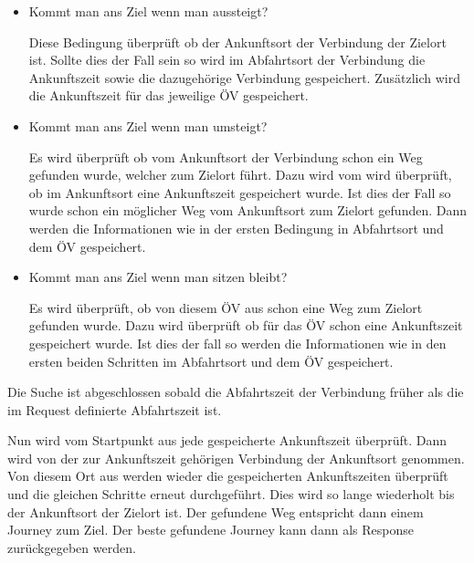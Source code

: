 \begin{itemize}
	\item Kommt man ans Ziel wenn man aussteigt?
	
	Diese Bedingung überprüft ob der Ankunftsort der Verbindung der Zielort ist. Sollte dies der Fall sein so wird im Abfahrtsort der Verbindung die Ankunftszeit sowie die dazugehörige Verbindung gespeichert. Zusätzlich wird die Ankunftszeit für das jeweilige ÖV gespeichert.
	\item Kommt man ans Ziel wenn man umsteigt?
	
	Es wird überprüft ob vom Ankunftsort der Verbindung schon ein Weg gefunden wurde, welcher zum Zielort führt. Dazu wird vom wird überprüft, ob im Ankunftsort eine Ankunftszeit gespeichert wurde. Ist dies der Fall so wurde schon ein möglicher Weg vom Ankunftsort zum Zielort gefunden. Dann werden die Informationen wie in der ersten Bedingung in Abfahrtsort und dem ÖV gespeichert.
	\item Kommt man ans Ziel wenn man sitzen bleibt?
	
	Es wird überprüft, ob von diesem ÖV aus schon eine Weg zum Zielort gefunden wurde. Dazu wird überprüft ob für das ÖV schon eine Ankunftszeit gespeichert wurde. Ist dies der fall so werden die Informationen wie in den ersten beiden Schritten im Abfahrtsort und dem ÖV gespeichert.
\end{itemize}
Die Suche ist abgeschlossen sobald die Abfahrtszeit der Verbindung früher als die im Request definierte Abfahrtszeit ist. 

Nun wird vom Startpunkt aus jede gespeicherte Ankunftszeit überprüft. Dann wird von der zur Ankunftszeit gehörigen Verbindung der Ankunftsort genommen. Von diesem Ort aus werden wieder die gespeicherten Ankunftszeiten überprüft und die gleichen Schritte erneut durchgeführt. Dies wird so lange wiederholt bis der Ankunftsort der Zielort ist. Der gefundene Weg entspricht dann einem Journey zum Ziel. Der beste gefundene Journey kann dann als Response zurückgegeben werden. 
